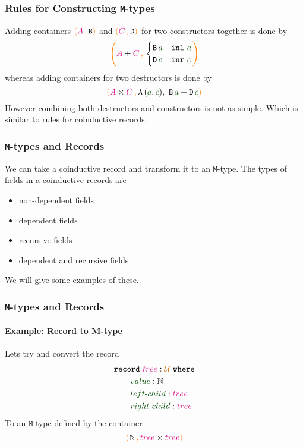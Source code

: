 \documentclass[xelatex,mathserif,serif,notheorems]{beamer} %
\theoremstyle{plain} %
\theoremstyle{definition}
\theoremstyle{remark}
\newcommand*{\term}[1]{\textcolor{green!30!black}{#1}} %
\newcommand*{\type}[1]{\textcolor{magenta!90!black}{#1}}
\newcommand*{\containerpair}[2]{\ensuremath{\colorlet{savedleftcolor}{.}\color{orange}\left(\color{savedleftcolor}#1\,\textcolor{orange}{\mathbf{,}}\,#2\color{orange}\right)\color{savedleftcolor}}}
\newcommand*{\universe}[1]{\textcolor{orange!80!black}{#1}}
\newcommand*{\typeformer}[1]{\ensuremath{\mathtt{#1}}}
\begin{document}
\begin{frame}
  \frametitle{Rules for Constructing \texttt{M}-types}
  Adding containers \(\containerpair{\type{A}}{\typeformer{B}}\) and \(\containerpair{\type{C}}{\typeformer{D}}\) for two constructors together is done by
  \begin{equation}
    \containerpair{\type{A} + \type{C}}{ \begin{cases} \typeformer{B}\,\term{a} & \mathtt{inl}~\term{a} \\ \typeformer{D}\,\term{c} & \mathtt{inr}~\term{c} \end{cases}}
  \end{equation}
  whereas adding containers for two destructors is done by
  \begin{equation}
    \containerpair{\type{A} \times \type{C}}{\lambda\,(\term{a},\term{c}),~\typeformer{B}\,\term{a} + \typeformer{D}\,\term{c}}  
  \end{equation}
  However combining both destructors and constructors is not as simple. Which is similar to rules for coinductive records.
\end{frame}

\begin{frame}
  \frametitle{\texttt{M}-types and Records}
  We can take a coinductive record and transform it to an \texttt{M}-type. The types of fields in a coinductive records are
  \begin{itemize}
  \item non-dependent fields
  \item dependent fields
  \item recursive fields
  \item dependent and recursive fields
  \end{itemize}
  We will give some examples of these.
\end{frame}

\begin{frame}
  \frametitle{\texttt{M}-types and Records}
  \framesubtitle{Example: Record to M-type}
  Lets try and convert the record
  \begin{equation}
    \begin{aligned}
      &\mathtt{record}~\type{tree} : \universe{\mathcal{U} }~\mathtt{where} \\
      &\qquad \term{value} : \mathbb{N} \\
      &\qquad \term{left\text{-}child} : \type{tree} \\
      &\qquad \term{right\text{-}child} : \type{tree}
    \end{aligned}
  \end{equation}
  To an \texttt{M}-type defined by the container
  \begin{equation}
    \containerpair{\mathbb{N}}{\type{tree} \times \type{tree}}
  \end{equation}
\end{frame}
\end{document}
